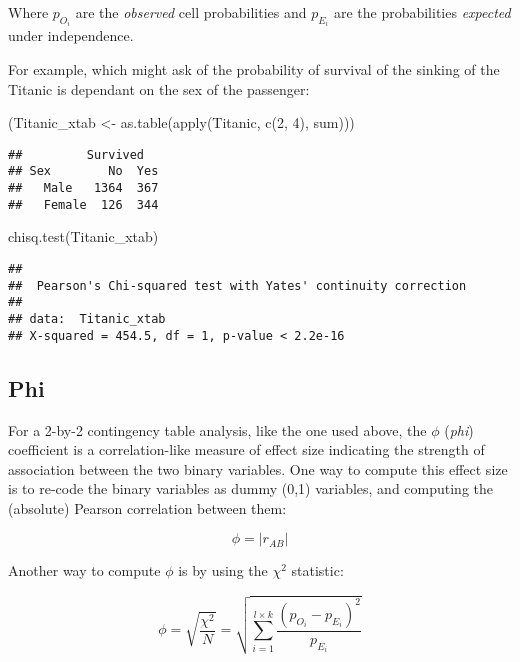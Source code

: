 \documentclass[
]{article}
\newenvironment{Shaded}{\begin{snugshade}}{\end{snugshade}}
\newcommand{\DecValTok}[1]{\textcolor[rgb]{0.00,0.00,0.81}{#1}}
\newcommand{\FunctionTok}[1]{\textcolor[rgb]{0.00,0.00,0.00}{#1}}
\newcommand{\NormalTok}[1]{#1}
\newcommand{\OtherTok}[1]{\textcolor[rgb]{0.56,0.35,0.01}{#1}}
\begin{document}
Where \(p_{O_i}\) are the \emph{observed} cell probabilities and
\(p_{E_i}\) are the probabilities \emph{expected} under independence.

For example, which might ask of the probability of survival of the
sinking of the Titanic is dependant on the sex of the passenger:

\begin{Shaded}
\begin{Highlighting}[]
\NormalTok{(Titanic\_xtab }\OtherTok{\textless{}{-}} \FunctionTok{as.table}\NormalTok{(}\FunctionTok{apply}\NormalTok{(Titanic, }\FunctionTok{c}\NormalTok{(}\DecValTok{2}\NormalTok{, }\DecValTok{4}\NormalTok{), sum)))}
\end{Highlighting}
\end{Shaded}

\begin{verbatim}
##         Survived
## Sex        No  Yes
##   Male   1364  367
##   Female  126  344
\end{verbatim}

\begin{Shaded}
\begin{Highlighting}[]
\FunctionTok{chisq.test}\NormalTok{(Titanic\_xtab)}
\end{Highlighting}
\end{Shaded}

\begin{verbatim}
## 
##  Pearson's Chi-squared test with Yates' continuity correction
## 
## data:  Titanic_xtab
## X-squared = 454.5, df = 1, p-value < 2.2e-16
\end{verbatim}

\hypertarget{phi}{%
\subsection{Phi}\label{phi}}

For a 2-by-2 contingency table analysis, like the one used above, the
\(\phi\) (\emph{phi}) coefficient is a correlation-like measure of
effect size indicating the strength of association between the two
binary variables. One way to compute this effect size is to re-code the
binary variables as dummy (0,1) variables, and computing the (absolute)
Pearson correlation between them:

\[
\phi = |r_{AB}|
\]

Another way to compute \(\phi\) is by using the \(\chi^2\) statistic:

\[
\phi = \sqrt{\frac{\chi^2}{N}} = \sqrt{\sum_{i=1}^{l\times k}{\frac{(p_{O_i}-p_{E_i})^2}{p_{E_i}}}}
\]
\end{document}
